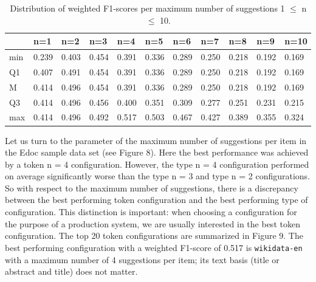 \begin{table}[]
\begin{tabular}{lllllllllll}
    & n=1   & n=2   & n=3   & n=4   & n=5   & n=6   & n=7   & n=8   & n=9   & n=10  \\ \hline
min & 0.239 & 0.403 & 0.454 & 0.391 & 0.336 & 0.289 & 0.250 & 0.218 & 0.192 & 0.169 \\
Q1  & 0.407 & 0.491 & 0.454 & 0.391 & 0.336 & 0.289 & 0.250 & 0.218 & 0.192 & 0.169 \\
M   & 0.414 & 0.496 & 0.454 & 0.391 & 0.336 & 0.289 & 0.250 & 0.218 & 0.192 & 0.169 \\
Q3  & 0.414 & 0.496 & 0.456 & 0.400 & 0.351 & 0.309 & 0.277 & 0.251 & 0.231 & 0.215 \\
max & 0.414 & 0.496 & 0.492 & 0.517 & 0.503 & 0.467 & 0.427 & 0.389 & 0.355 & 0.324
\end{tabular}
\caption{Distribution of weighted F1-scores per maximum number of suggestions 1 $\leq$ n $\leq$ 10.}
\label{tab:max-number}
\end{table}

Let us turn to the parameter of the maximum number of suggestions per
item in the Edoc sample data set (see Figure 8). Here the best
performance was achieved by a token n = 4 configuration. However, the
type n = 4 configuration performed on average significantly worse than
the type n = 3 and type n = 2 configurations. So with respect to the
maximum number of suggestions, there is a discrepancy between the best
performing token configuration and the best performing type of
configuration. This distinction is important: when choosing a
configuration for the purpose of a production system, we are usually
interested in the best token configuration. The top 20 token
configurations are summarized in Figure 9. The best performing
configuration with a weighted F1-score of 0.517 is \texttt{wikidata-en}
with a maximum number of 4 suggestions per item; its text basis (title
or abstract and title) does not matter.

